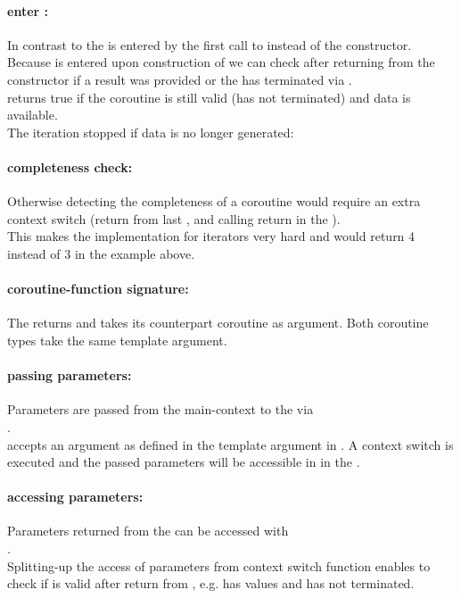 \paragraph*{enter \corofunction:}
In contrast to \pullcoro the \corofunction is entered by the first call to
\pushcoroop instead of the constructor.\\
\newline
Because \corofunction is entered upon construction of \pullcoro we can check after
returning from the constructor if a result was provided or the \corofunction
has terminated via \pullcorobool.\\
\pullcorobool returns true if the coroutine is still valid (\corofunction has
not terminated) and data is available.\\
The iteration stopped if data is no longer generated:

\paragraph*{completeness check:}
Otherwise detecting the completeness of a coroutine would require an extra context
switch (return from last \pullcoroop, \pushcoroop and calling return in the \corofunction).\\
This makes the implementation for iterators very hard and 
would return 4 instead of 3 in the example above.

\paragraph*{coroutine-function signature:}
The \corofunction returns  and takes its counterpart coroutine as argument.
Both coroutine types take the same template argument.\\

\paragraph*{passing parameters:}
Parameters are passed from the main-context to the \corofunction via\\\pushcoroop.\\
\newline
\pushcoroop accepts an argument as defined in the template argument in \pushcoro. A
context switch is executed and the passed parameters will be accessible in in
the \corofunction.

\paragraph*{accessing parameters:}
Parameters returned from the \corofunction can be accessed with\\\pullcoroget.\\
\newline
Splitting-up the access of parameters from context switch function enables to
check if \pullcoro is valid after return from \pullcoroop, e.g. \pullcoro has values
and \corofunction has not terminated.

